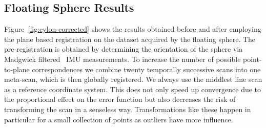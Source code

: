 \subsection{Floating Sphere Results}

Figure~\ref{fig:cylon-corrected} shows the results obtained before and after employing the plane based registration on the dataset acquired by the floating sphere.
The pre-registration is obtained by determining the orientation of the sphere via Madgwick filtered~\cite{madgwick2010efficient} IMU measurements.
To increase the number of possible point-to-plane correspondences we combine twenty temporally successive scans into one meta-scan, which is then globally registered. 
We always use the middlest line scan as a reference coordinate system.
This does not only speed up convergence due to the proportional effect on the error function but also decreases the risk of transforming the scan in a senseless way.
Transformations like these happen in particular for a small collection of points as outliers have more influence.

